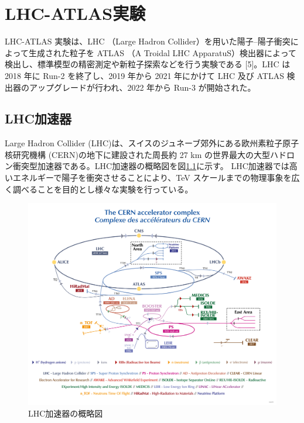 \chapter{LHC-ATLAS実験}
\label{chapter2}

LHC-ATLAS 実験は、LHC （Large Hadron Collider）を用いた陽子–陽子衝突によって生成された粒子を ATLAS （A Troidal LHC ApparatuS）検出器によって検出し、標準模型の精密測定や新粒子探索などを行う実験である [5]。LHC は 2018 年に Run-2 を終了し、2019 年から 2021 年にかけて LHC 及び ATLAS 検出器のアップグレードが行われ、2022 年から Run-3 が開始された。

\section{LHC加速器}
\label{section2-1}

Large Hadron Collider (LHC)は、スイスのジュネーブ郊外にある欧州素粒子原子核研究機構 (CERN)の地下に建設された周長約 27 km の世界最大の大型ハドロン衝突型加速器である。LHC加速器の概略図を図\ref{fig:LHC加速器}に示す。
LHC加速器では高いエネルギーで陽子を衝突させることにより、TeV スケールまでの物理事象を広く調べることを目的とし様々な実験を行っている。

\begin{figure}[tb]
  \centering
  \includegraphics[clip]{fig/2/accel_complex-v2022_complex.png}
  \caption{LHC加速器の概略図}
  \label{fig:LHC加速器}
\end{figure}


